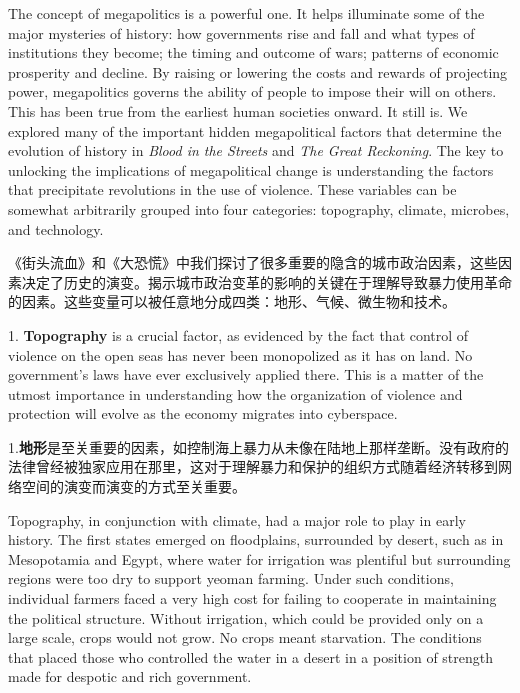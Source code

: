 \begin{Parallel}{97mm}{45mm}
  \ParallelLText
  {The concept of megapolitics is a powerful one. It helps illuminate some of the major mysteries of history: how governments rise and fall and what types of institutions they become; the timing and outcome of wars; patterns of economic prosperity and decline. By raising or lowering the costs and rewards of projecting power, megapolitics governs the ability of people to impose their will on others. This has been true from the earliest human societies onward. It still is. We explored many of the important hidden megapolitical factors that determine the evolution of history in \emph{Blood in the Streets} and \emph{The Great Reckoning}. The key to unlocking the implications of megapolitical change is understanding the factors that precipitate revolutions in the use of violence. These variables can be somewhat arbitrarily grouped into four categories: topography, climate, microbes, and technology.}
  
  \ParallelRText
  {《街头流血》和《大恐慌》中我们探讨了很多重要的隐含的城市政治因素，这些因素决定了历史的演变。揭示城市政治变革的影响的关键在于理解导致暴力使用革命的因素。这些变量可以被任意地分成四类：地形、气候、微生物和技术。}
  \ParallelPar



  \ParallelLText
  {1. \textbf{Topography} is a crucial factor, as evidenced by the fact that control of violence on the open seas has never been monopolized as it has on land. No government's laws have ever exclusively applied there. This is a matter of the utmost importance in understanding how the organization of violence and protection will evolve as the economy migrates into cyberspace.}
  
  \ParallelRText
  {1.\textbf{地形}是至关重要的因素，如控制海上暴力从未像在陆地上那样垄断。没有政府的法律曾经被独家应用在那里，这对于理解暴力和保护的组织方式随着经济转移到网络空间的演变而演变的方式至关重要。}
  \ParallelPar


  \ParallelLText
  {Topography, in conjunction with climate, had a major role to play in early history. The first states emerged on floodplains, surrounded by desert, such as in Mesopotamia and Egypt, where water for irrigation was plentiful but surrounding regions were too dry to support yeoman farming. Under such conditions, individual farmers faced a very high cost for failing to cooperate in maintaining the political structure. Without irrigation, which could be provided only on a large scale, crops would not grow. No crops meant starvation. The conditions that placed those who controlled the water in a desert in a position of strength made for despotic and rich government.}
  

\end{Parallel}
